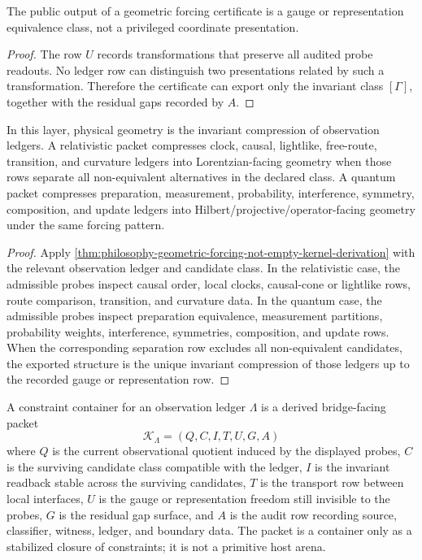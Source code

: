 \begin{corollary}
\label{cor:philosophy-forced-geometry-gauge-class}
The public output of a geometric forcing certificate is a gauge or
representation equivalence class, not a privileged coordinate presentation.
\end{corollary}
\begin{proof}
The row $U$ records transformations that preserve all audited probe readouts.
No ledger row can distinguish two presentations related by such a
transformation. Therefore the certificate can export only the invariant
class $[\Gamma]$, together with the residual gaps recorded by $A$.
\end{proof}

\begin{corollary}
\label{cor:philosophy-physical-geometry-invariant-compression}
In this layer, physical geometry is the invariant compression of observation
ledgers. A relativistic packet compresses clock, causal, lightlike,
free-route, transition, and curvature ledgers into Lorentzian-facing
geometry when those rows separate all non-equivalent alternatives in the
declared class. A quantum packet compresses preparation, measurement,
probability, interference, symmetry, composition, and update ledgers into
Hilbert/projective/operator-facing geometry under the same forcing pattern.
\end{corollary}
\begin{proof}
Apply \autoref{thm:philosophy-geometric-forcing-not-empty-kernel-derivation}
with the relevant observation ledger and candidate class. In the relativistic
case, the admissible probes inspect causal order, local clocks, causal-cone
or lightlike rows, route comparison, transition, and curvature data. In the
quantum case, the admissible probes inspect preparation equivalence,
measurement partitions, probability weights, interference, symmetries,
composition, and update rows. When the corresponding separation row excludes
all non-equivalent candidates, the exported structure is the unique invariant
compression of those ledgers up to the recorded gauge or representation row.
\end{proof}

\begin{definition}
\label{def:philosophy-constraint-container}
A constraint container for an observation ledger $\Lambda$ is a derived
bridge-facing packet
$$
\mathcal{K}_{\Lambda}=(Q,C,I,T,U,G,A)
$$
where $Q$ is the current observational quotient induced by the displayed
probes, $C$ is the surviving candidate class compatible with the ledger, $I$
is the invariant readback stable across the surviving candidates, $T$ is the
transport row between local interfaces, $U$ is the gauge or representation
freedom still invisible to the probes, $G$ is the residual gap surface, and
$A$ is the audit row recording source, classifier, witness, ledger, and
boundary data. The packet is a container only as a stabilized closure of
constraints; it is not a primitive host arena.
\end{definition}

